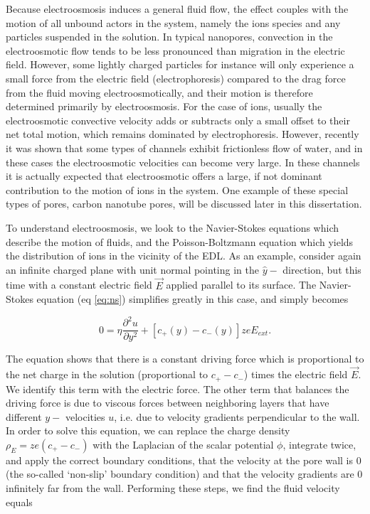 			Because electroosmosis induces a general fluid flow, the effect couples with the motion of all unbound actors in the system, namely the ions species and any particles suspended in the solution. In typical nanopores, convection in the electroosmotic flow tends to be less pronounced than migration in the electric field. However, some lightly charged particles for instance will only experience a small force from the electric field (electrophoresis) compared to the drag force from the fluid moving electroosmotically, and their motion is therefore determined primarily by electroosmosis. For the case of ions, usually the electroosmotic convective velocity adds or subtracts only a small offset to their net total motion, which remains dominated by electrophoresis. However, recently it was shown that some types of channels exhibit frictionless flow of water, and in these cases the electroosmotic velocities can become very large. In these channels it is actually expected that electroosmotic offers a large, if not dominant contribution to the motion of ions in the system. One example of these special types of pores, carbon nanotube pores, will be discussed later in this dissertation.
			
			To understand electroosmosis, we look to the Navier-Stokes equations which describe the motion of fluids, and the Poisson-Boltzmann equation which yields the distribution of ions in the vicinity of the EDL. As an example, consider again an infinite charged plane with unit normal pointing in the $\hat{y}-$ direction, but this time with a constant electric field $\vec{E}$ applied parallel to its surface. The Navier-Stokes equation (eq \ref{eq:ns}) simplifies greatly in this case, and simply becomes
			
			\[ 0 = \eta\frac{\partial^{2}u}{\partial y^{2}}+\left[c_{+}\left(y\right)-c_{-}\left(y\right)\right]zeE_{ext}. \]
			
			The equation shows that there is a constant driving force which is proportional to the net charge in the solution (proportional to $c_{+}-c_{-}$) times the electric field $\vec{E}$. We identify this term with the electric force. The other term that balances the driving force is due to viscous forces between neighboring layers that have different $y-$ velocities $u$, i.e. due to velocity gradients perpendicular to the wall. In order to solve this equation, we can replace the charge density $\rho_{E}=ze\left(c_{+}-c_{-}\right)$ with the Laplacian of the scalar potential $\phi$, integrate twice, and apply the correct boundary conditions, that the velocity at the pore wall is 0 (the so-called `non-slip' boundary condition) and that the velocity gradients are 0 infinitely far from the wall.  Performing these steps, we find the fluid velocity equals 
			
